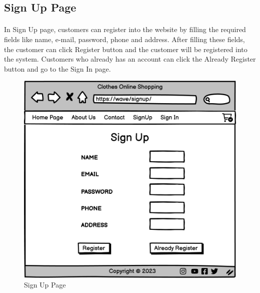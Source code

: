 \subsection{Sign Up Page}
\bigskip
\paragraph{}
In Sign Up page, customers can register into the website by filling the required fields like name, e-mail, password, phone and address. After filling these fields, the customer can click Register button and the customer will be registered into the system. Customers who already has an account can click the Already Register button and go to the Sign In page. 

\bigskip
\bigskip
\bigskip
\begin{figure}[h]
\centerline{\includegraphics[scale=1.]{images/Sign Up.png}}
\caption{Sign Up Page}
\label{fig}
\end{figure}